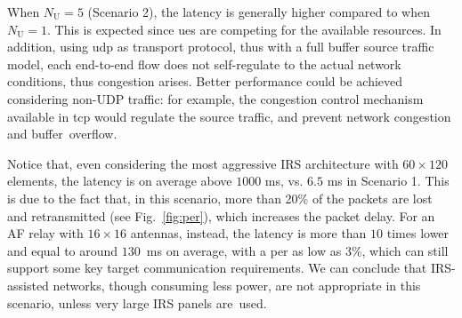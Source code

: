 When $N_{\mathrm U}=5$ (Scenario 2), the latency is generally higher compared to when $N_{\mathrm U}=1$. This is expected since \glspl{ue} are competing for the available resources. In addition, using \gls{udp} as transport protocol, thus with a full buffer source traffic model, each end-to-end flow does not self-regulate to the actual network conditions, thus congestion arises. 
Better performance could be achieved considering non-UDP traffic: for example, the congestion control mechanism available in \gls{tcp} would regulate the source traffic, and prevent network congestion and buffer~overflow.

Notice that, even considering the most aggressive IRS architecture with $60\times120$ elements, the latency is on average above $1000$ ms, vs. $6.5$ ms in Scenario 1. 
This is due to the fact that, in this scenario, more than 20\% of the packets are lost and retransmitted (see Fig.~\ref{fig:per}), which increases the packet delay.
For an AF relay with $16\times16$ antennas, instead, the latency is more than $10$ times lower and equal to around $130$~ms on average, with a \gls{per} as low as 3\%, which can still support some key target communication requirements.
We can conclude that IRS-assisted networks, though consuming less power, are not appropriate in this scenario, unless very large IRS panels are~used.




%	
%
%	





